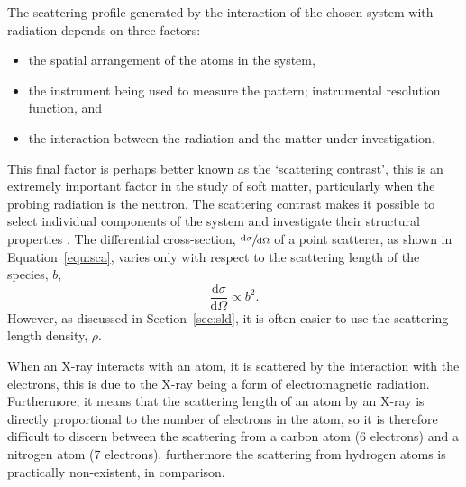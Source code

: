 The scattering profile generated by the interaction of the chosen system with radiation depends on three factors:
%
\begin{itemize}
    \item the spatial arrangement of the atoms in the system,
    \item the instrument being used to measure the pattern; instrumental resolution function, and
    \item the interaction between the radiation and the matter under investigation.
\end{itemize}
%
This final factor is perhaps better known as the `scattering contrast', this is an extremely important factor in the study of soft matter, particularly when the probing radiation is the neutron.
The scattering contrast makes it possible to select individual components of the system and investigate their structural properties \cite{schurtenberger_contrast_2002}.
The differential cross-section, $\sfrac{\text{d}\sigma}{\text{d}\Omega}$ of a point scatterer, as shown in Equation~\ref{equ:sca}, varies only with respect to the scattering length of the species, $b$,
%
\begin{equation}
    \frac{\text{d}\sigma}{\text{d}\Omega} \propto b^2.
\end{equation}
%
However, as discussed in Section~\ref{sec:sld}, it is often easier to use the scattering length density, $\rho$.

When an X-ray interacts with an atom, it is scattered by the interaction with the electrons, this is due to the X-ray being a form of electromagnetic radiation.
Furthermore, it means that the scattering length of an atom by an X-ray is directly proportional to the number of electrons in the atom, so it is therefore difficult to discern between the scattering from a carbon atom (6 electrons) and a nitrogen atom (7 electrons), furthermore the scattering from hydrogen atoms is practically non-existent, in comparison.

